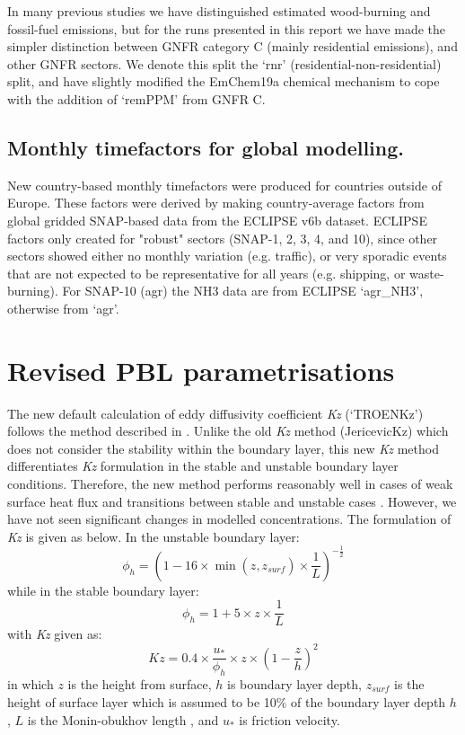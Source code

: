 In many previous studies we have distinguished estimated wood-burning and
fossil-fuel emissions, but for the runs presented in this report we
have made the simpler distinction between GNFR category C (mainly
residential emissions), and other GNFR sectors.  We denote this
split the `rnr' (residential-non-residential) split, and have slightly
modified the EmChem19a chemical mechanism to cope with the addition
of `remPPM' from GNFR C.

\subsection{Monthly timefactors for global modelling.}
\label{ssec:monthlyFacs}

New country-based monthly timefactors were produced for countries outside of Europe. These factors were derived by making country-average factors from global gridded SNAP-based data from the ECLIPSE v6b dataset. ECLIPSE factors only created for "robust" sectors (SNAP-1, 2, 3, 4, and 10), since other sectors showed either no monthly variation (e.g. traffic), or very sporadic events that are not expected to be representative for all years (e.g. shipping, or waste-burning). For SNAP-10 (agr) the NH3 data are from ECLIPSE `agr\_NH3', otherwise from `agr'.



\section{Revised PBL parametrisations}
\label{sec:updateKz}

The new default calculation of eddy diffusivity coefficient \textit{Kz} (`TROENKz') follows the method described in \citet{troenkz}. Unlike the old \textit{Kz} method (JericevicKz) which does not consider the stability within the boundary layer, this new \textit{Kz} method differentiates \textit{Kz} formulation in the stable and unstable boundary layer conditions. Therefore, the new method performs reasonably well in cases of weak surface heat flux and transitions between stable and unstable cases \citep{troenkz}. However, we have not seen significant changes in modelled concentrations. The formulation of \textit{Kz} is given as below. In the unstable boundary layer:
\begin{equation}
    \phi_h = (1 - 16 \times \min(z, z_\mathit{surf}) \times \frac{1}{L})^{-\frac 1 2}
\end{equation}
while in the stable boundary layer:
\begin{equation}
    \phi_h = 1 + 5 \times z \times \frac{1}{L}
\end{equation}
with \textit{Kz} given as: 
\begin{equation}
    \mathit{Kz} = 0.4 \times \frac{u_*}{\phi_h} \times z \times (1 - \frac z h)^2
\end{equation}
in which $z$ is the height from surface, $h$ is boundary layer depth, $z_\mathit{surf}$ is the height of surface layer which is assumed to be 10\% of the boundary layer depth $h$,  $L$ is the Monin-obukhov length \citep{Garratt}, and $u_*$ is friction velocity.

